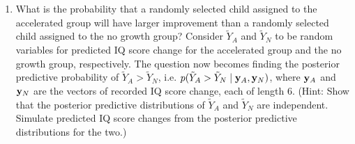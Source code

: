 \documentclass[11pt]{article}
\begin{document}
\begin{enumerate}
\begin{enumerate}
\item What is the probability that a randomly selected child assigned to the accelerated group will have larger improvement than a randomly selected child assigned to the no growth group? Consider $\tilde{Y}_A$ and $\tilde{Y}_N$ to be random variables for predicted IQ score change for the accelerated group and the no growth group, respectively. The question now becomes finding the posterior predictive probability of $\tilde{Y}_A > \tilde{Y}_N$, i.e. $p(\tilde{Y}_A > \tilde{Y}_N \mid {\bf y}_A, {\bf y}_N)$, where ${\bf y}_A$ and ${\bf y}_N$ are the vectors of recorded IQ score change, each of length 6. (Hint: Show that the posterior predictive distributions of $\tilde{Y}_A$ and $\tilde{Y}_N$ are independent.  Simulate predicted IQ score changes from the posterior predictive distributions for the two.)


\end{enumerate}




\end{enumerate}
\end{document}
